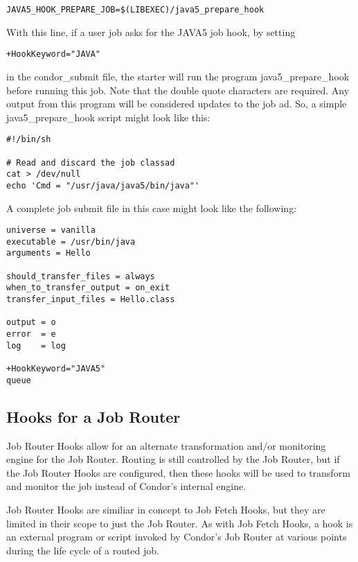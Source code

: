 \begin{verbatim}
JAVA5_HOOK_PREPARE_JOB=$(LIBEXEC)/java5_prepare_hook
\end{verbatim}

With this line, if a user job asks for the JAVA5 job hook, by setting

\begin{verbatim}
+HookKeyword="JAVA"
\end{verbatim}

in the condor\_submit file, the starter will run the program java5\_prepare\_hook 
before running this job.  Note that the double quote characters are required.
Any output from this program will be considered updates to the job ad.  
So, a simple java5\_prepare\_hook script might look like this:

\begin{verbatim}
#!/bin/sh

# Read and discard the job classad
cat > /dev/null
echo 'Cmd = "/usr/java/java5/bin/java"'
\end{verbatim}

A complete job submit file in this case might look like the following:
\begin{verbatim}
universe = vanilla
executable = /usr/bin/java
arguments = Hello

should_transfer_files = always
when_to_transfer_output = on_exit
transfer_input_files = Hello.class

output = o
error  = e
log    = log

+HookKeyword="JAVA5"
queue

\end{verbatim}

\subsection{\label{sec:job-hooks-JR-overview}
Hooks for a Job Router}

Job Router Hooks allow for an alternate transformation and/or 
monitoring engine for the Job Router.
Routing is still controlled by the Job Router,
but if the Job Router Hooks are configured,
then these hooks will be used to transform
and monitor the job instead of Condor's internal engine.

Job Router Hooks are similiar in concept to Job Fetch Hooks,
but they are limited in their scope to just the Job Router.
As with Job Fetch Hooks,
a hook is an external program or script invoked by Condor's Job Router
at various points during the life cycle of a routed job.

